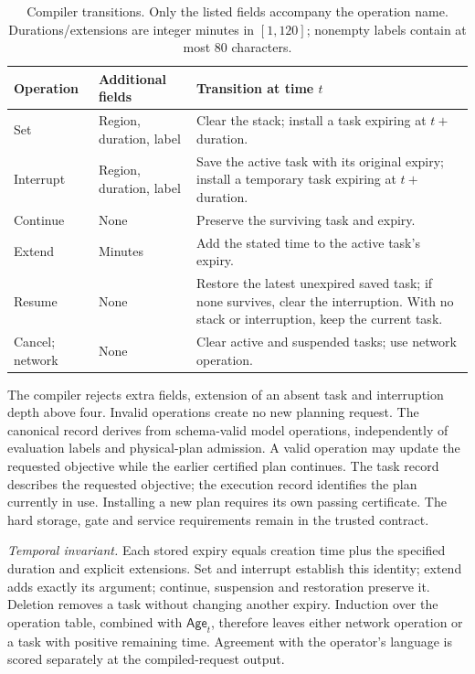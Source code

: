 \documentclass[journal,10pt]{IEEEtran}
\begin{document}
\begin{table}[t]
\centering\small
\caption{Compiler transitions. Only the listed fields accompany the operation
name. Durations/extensions are integer minutes in $[1,120]$; nonempty labels
contain at most 80 characters.}
\label{tab:task-state-operations}
\begin{tabular}{@{}p{}p{}p{}@{}}
\toprule
Operation & Additional fields & Transition at time $t$\\
\midrule
Set & Region, duration, label & Clear the stack; install a task expiring at
$t+$ duration.\\
Interrupt & Region, duration, label & Save the active task with its original
expiry; install a temporary task expiring at $t+$ duration.\\
Continue & None & Preserve the surviving task and expiry.\\
Extend & Minutes & Add the stated time to the active task's expiry.\\
Resume & None & Restore the latest unexpired saved task; if none survives,
clear the interruption. With no stack or interruption, keep the current task.\\
Cancel; network & None & Clear active and suspended tasks; use network operation.\\
\bottomrule
\end{tabular}
\end{table}

The compiler rejects extra fields, extension of an absent task and
interruption depth above four. Invalid operations create no new planning
request. The canonical record derives from schema-valid model operations,
independently of evaluation labels and physical-plan admission. A valid operation may update the requested objective while the earlier
certified plan continues. The task record describes the requested objective;
the execution record identifies the plan currently in use. Installing a new
plan requires its own passing certificate.
The hard storage, gate and service requirements remain in the trusted contract.

\emph{Temporal invariant.} Each stored expiry equals creation time plus the
specified duration and explicit extensions. Set and interrupt establish this
identity; extend adds exactly its argument; continue, suspension and restoration
preserve it. Deletion removes a task without changing another expiry.
Induction over the operation table, combined with $\mathsf{Age}_t$, therefore leaves either
network operation or a task with positive remaining time. Agreement with the
operator's language is scored separately at the compiled-request output.
\end{document}
